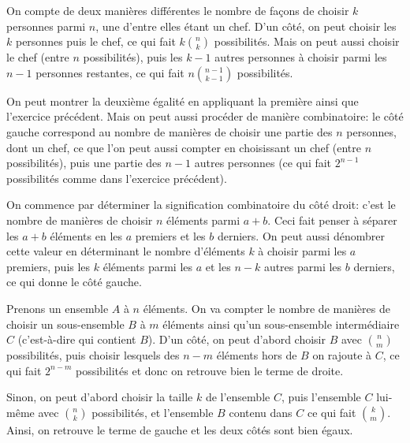 \begin{sol}
On compte de deux manières différentes le nombre de façons de choisir $k$ personnes parmi $n$, une d'entre elles étant un chef. D'un côté, on peut choisir les $k$ personnes puis le chef, ce qui fait $k\binom nk$ possibilités. Mais on peut aussi choisir le chef (entre $n$ possibilités), puis les $k-1$ autres personnes à choisir parmi les $n-1$ personnes restantes, ce qui fait $n\binom{n-1}{k-1}$ possibilités.

On peut montrer la deuxième égalité en appliquant la première ainsi que l'exercice précédent. Mais on peut aussi procéder de manière combinatoire: le côté gauche correspond au nombre de manières de choisir une partie des $n$ personnes, dont un chef, ce que l'on peut aussi compter en choisissant un chef (entre $n$ possibilités), puis une partie des $n-1$ autres personnes (ce qui fait $2^{n-1}$ possibilités comme dans l'exercice précédent).
\end{sol}

\begin{sol}
On commence par déterminer la signification combinatoire du côté droit: c'est le nombre de manières de choisir $n$ éléments parmi $a+b$. Ceci fait penser à séparer les $a+b$ éléments en les $a$ premiers et les $b$ derniers. On peut aussi dénombrer cette valeur en déterminant le nombre d'éléments $k$ à choisir parmi les $a$ premiers, puis les $k$ éléments parmi les $a$ et les $n-k$ autres parmi les $b$ derniers, ce qui donne le côté gauche.
\end{sol}

\begin{sol}
Prenons un ensemble $A$ à $n$ éléments. On va compter le nombre de manières de choisir un sous-ensemble $B$ à $m$ éléments ainsi qu'un sous-ensemble intermédiaire $C$ (c'est-à-dire qui contient $B$). D'un côté, on peut d'abord choisir $B$ avec $\binom nm$ possibilités, puis choisir lesquels des $n-m$ éléments hors de $B$ on rajoute à $C$, ce qui fait $2^{n-m}$ possibilités et donc on retrouve bien le terme de droite.

Sinon, on peut d'abord choisir la taille $k$ de l'ensemble $C$, puis l'ensemble $C$ lui-même avec $\binom nk$ possibilités, et l'ensemble $B$ contenu dans $C$ ce qui fait $\binom km$. Ainsi, on retrouve le terme de gauche et les deux côtés sont bien égaux.
\end{sol}

